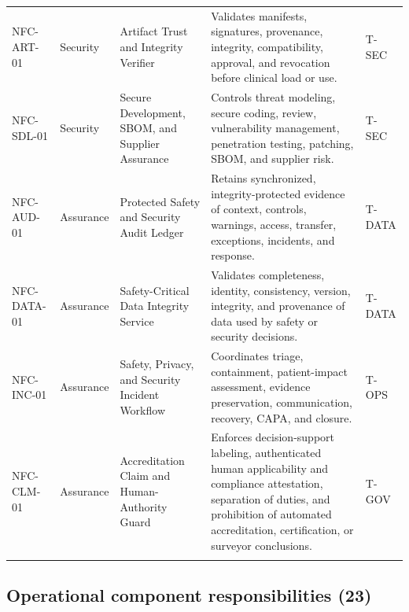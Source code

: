 \documentclass[11pt,letterpaper]{article}
\begin{document}
\begin{scriptsize}
\begin{longtable}{@{}L{0.15\textwidth}L{0.11\textwidth}L{0.21\textwidth}L{0.38\textwidth}L{0.08\textwidth}@{}}
\addlinespace[2pt]
\mbox{NFC-ART-01} & Security & Artifact Trust and Integrity Verifier & Validates manifests, signatures, provenance, integrity, compatibility, approval, and revocation before clinical load or use. & T-SEC \\
\addlinespace[2pt]
\mbox{NFC-SDL-01} & Security & Secure Development, SBOM, and Supplier Assurance & Controls threat modeling, secure coding, review, vulnerability management, penetration testing, patching, SBOM, and supplier risk. & T-SEC \\
\addlinespace[2pt]
\mbox{NFC-AUD-01} & Assurance & Protected Safety and Security Audit Ledger & Retains synchronized, integrity-protected evidence of context, controls, warnings, access, transfer, exceptions, incidents, and response. & T-DATA \\
\addlinespace[2pt]
\mbox{NFC-DATA-01} & Assurance & Safety-Critical Data Integrity Service & Validates completeness, identity, consistency, version, integrity, and provenance of data used by safety or security decisions. & T-DATA \\
\addlinespace[2pt]
\mbox{NFC-INC-01} & Assurance & Safety, Privacy, and Security Incident Workflow & Coordinates triage, containment, patient-impact assessment, evidence preservation, communication, recovery, CAPA, and closure. & T-OPS \\
\addlinespace[2pt]
\mbox{NFC-CLM-01} & Assurance & Accreditation Claim and Human-Authority Guard & Enforces decision-support labeling, authenticated human applicability and compliance attestation, separation of duties, and prohibition of automated accreditation, certification, or surveyor conclusions. & T-GOV \\
\addlinespace[2pt]
\end{longtable}
\end{scriptsize}

\subsection{Operational component responsibilities (23)}
\end{document}
